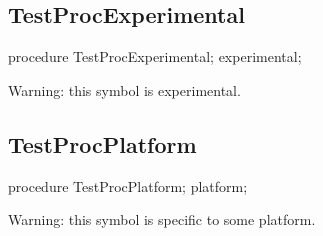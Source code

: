 \documentclass{report}
\begin{document}
\subsection*{TestProcExperimental}
\begin{list}{}{
\setlength{\itemindent}{0cm}
\setlength{\listparindent}{0cm}
\setlength{\leftmargin}{\evensidemargin}
\addtolength{\leftmargin}{\tmplength}
\settowidth{\labelsep}{X}
\addtolength{\leftmargin}{\labelsep}
\setlength{\labelwidth}{\tmplength}
}
\begin{flushleft}
\item[\textbf{Declaration}\hfill]
\begin{ttfamily}
procedure TestProcExperimental; experimental;\end{ttfamily}


\end{flushleft}
\par
\item[\textbf{Description}]
Warning: this symbol is experimental.

 

\end{list}
\subsection*{TestProcPlatform}
\begin{list}{}{
\setlength{\itemindent}{0cm}
\setlength{\listparindent}{0cm}
\setlength{\leftmargin}{\evensidemargin}
\addtolength{\leftmargin}{\tmplength}
\settowidth{\labelsep}{X}
\addtolength{\leftmargin}{\labelsep}
\setlength{\labelwidth}{\tmplength}
}
\begin{flushleft}
\item[\textbf{Declaration}\hfill]
\begin{ttfamily}
procedure TestProcPlatform; platform;\end{ttfamily}


\end{flushleft}
\par
\item[\textbf{Description}]
Warning: this symbol is specific to some platform.

 

\end{list}
\end{document}

